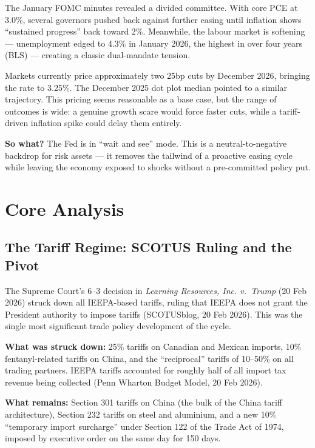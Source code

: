 \documentclass{wilson-report}
\begin{document}
The January FOMC minutes revealed a divided committee. With core PCE at 3.0\%, several governors pushed back against further easing until inflation shows ``sustained progress'' back toward 2\%. Meanwhile, the labour market is softening --- unemployment edged to 4.3\% in January 2026, the highest in over four years (BLS) --- creating a classic dual-mandate tension.

Markets currently price approximately two 25bp cuts by December 2026, bringing the rate to 3.25\%. The December 2025 dot plot median pointed to a similar trajectory. This pricing seems reasonable as a base case, but the range of outcomes is wide: a genuine growth scare would force faster cuts, while a tariff-driven inflation spike could delay them entirely.

\textbf{So what?} The Fed is in ``wait and see'' mode. This is a neutral-to-negative backdrop for risk assets --- it removes the tailwind of a proactive easing cycle while leaving the economy exposed to shocks without a pre-committed policy put.

\section{Core Analysis}

\subsection{The Tariff Regime: SCOTUS Ruling and the Pivot}

The Supreme Court's 6--3 decision in \textit{Learning Resources, Inc. v.\ Trump} (20 Feb 2026) struck down all IEEPA-based tariffs, ruling that IEEPA does not grant the President authority to impose tariffs (SCOTUSblog, 20 Feb 2026). This was the single most significant trade policy development of the cycle.

\textbf{What was struck down:} 25\% tariffs on Canadian and Mexican imports, 10\% fentanyl-related tariffs on China, and the ``reciprocal'' tariffs of 10--50\% on all trading partners. IEEPA tariffs accounted for roughly half of all import tax revenue being collected (Penn Wharton Budget Model, 20 Feb 2026).

\textbf{What remains:} Section 301 tariffs on China (the bulk of the China tariff architecture), Section 232 tariffs on steel and aluminium, and a new 10\% ``temporary import surcharge'' under Section 122 of the Trade Act of 1974, imposed by executive order on the same day for 150 days.
\end{document}
